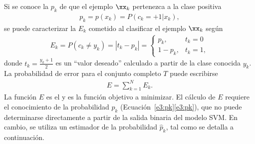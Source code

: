 Si se conoce la  $p_k$ de que el ejemplo
$\xx_k$ pertenezca a la clase positiva
%
\begin{align}
  \label{e3:pk}
  p_k = p(x_k) = P(c_k=+1|x_k),
\end{align}
%
se puede caracterizar la  $E_k$ cometido al
clasificar el ejemplo $\xx_k$ según
%
\begin{align}
\label{e3:Ek}
  E_k = P(c_k\neq y_k) = |t_k-{p}_k| =
  \begin{cases}
    {p}_k, & t_k=0\\ 1-{p}_k, & t_k = 1,
  \end{cases}
\end{align}
%
donde $t_k=\frac{y_k+1}{2}$ es un ``valor deseado'' calculado a partir
de la clase conocida $y_k$. La probabilidad de error para el conjunto
completo $T$ puede escribirse
%
\begin{align}
\label{Err1}
  E = \sum_{k=1}^{N} E_k.
\end{align}
%
La función $E$ es el  y es la función objetivo a
minimizar. El cálculo de $E$ requiere el conocimiento de la
probabilidad $p_k$ (\iflatexml{}Ecuación~\ref{e3:pk}\else\autoref{e3:pk}\fi),
que no puede determinarse directamente a partir de la salida binaria
del modelo SVM. En cambio, se utiliza un estimador de la probabilidad
$\hat{p}_k$, tal como se detalla a continuación.
